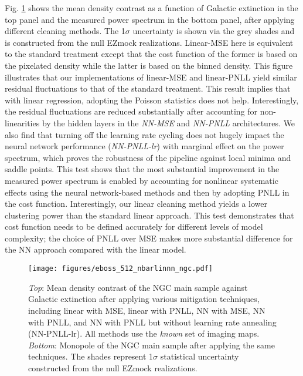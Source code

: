 Fig. \ref{fig:nbarmethods} shows the mean density contrast as a function of Galactic extinction in the top panel and the measured power spectrum in the bottom panel, after applying different cleaning methods. The 1$\sigma$ uncertainty is shown via the grey shades and is constructed from the null EZmock realizations. Linear-MSE here is  equivalent to the standard treatment except that the cost function of the former is based on the pixelated density while the latter is based on the binned density. This figure illustrates that our implementations of linear-MSE and linear-PNLL yield similar residual fluctuations to that of the standard treatment. This result implies that with linear regression, adopting the Poisson statistics does not help. Interestingly, the residual fluctuations are reduced substantially after accounting for non-linearities by the hidden layers in the \textit{NN-MSE} and \textit{NN-PNLL} architectures. We also find that turning off the learning rate cycling does not hugely impact the neural network performance (\textit{NN-PNLL-lr}) with marginal effect on the power spectrum, which proves the robustness of the pipeline against local minima and saddle points. This test shows that the most substantial improvement in the measured power spectrum is enabled by accounting for nonlinear systematic effects using the neural network-based methods and then by adopting PNLL in the cost function. Interestingly, our linear cleaning method yields a lower clustering power than the standard linear approach. This test demonstrates that cost function needs to be defined accurately for different levels of model complexity; the choice of PNLL over MSE makes more substantial difference for the NN approach compared with the linear model.

\begin{figure}
    \centering
    \texttt{[image: figures/eboss\_512\_nbarlinnn\_ngc.pdf]} 
    \caption[Mean density and power spectrum of eBOSS quasars for different methods.]{\textit{Top}: Mean density contrast of the NGC main sample against Galactic extinction after applying various mitigation techniques, including linear with MSE, linear with PNLL, NN with MSE, NN with PNLL, and NN with PNLL but without learning rate annealing (NN-PNLL-lr). All methods use the \textit{known} set of imaging maps.  \textit{Bottom}: Monopole of the NGC main sample after applying the same techniques.  The shades represent 1$\sigma$ statistical uncertainty constructed from the null EZmock realizations.}
    \label{fig:nbarmethods}
\end{figure}

